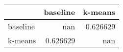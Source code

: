 \begin{tabular}{lrr}
\toprule
          &   baseline &    k-means \\
\midrule
 baseline & nan        &   0.626629 \\
 k-means  &   0.626629 & nan        \\
\bottomrule
\end{tabular}